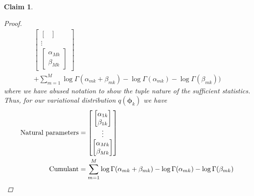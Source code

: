 \documentclass[11pt]{article}
\newtheorem{claim}{Claim}
\begin{document}
\begin{claim}
\begin{proof}
\begin{align*}
\begin{bmatrix}
\begin{bmatrix}
				\end{bmatrix} \\
				\vdots \\
				\begin{bmatrix}
				\alpha_{Mk} \\ \beta_{Mk}
				\end{bmatrix}
			\end{bmatrix} \\
			+ \sum\limits_{m=1}^M \log \Gamma(\alpha_{mk} + \beta_{mk}) - \log \Gamma(\alpha_{mk}) - \log\Gamma(\beta_{mk}) \bigg)
\end{align*}
where we have abused notation to show the tuple nature of the sufficient statistics. Thus, for our variational distribution $q(\bm{\phi}_k)$ we have
\begin{align}
\text{Natural parameters} &=  			\begin{bmatrix}
				\begin{bmatrix}
				\alpha_{1k} \\ \beta_{1k} 
				\end{bmatrix} \\
				\vdots \\
				\begin{bmatrix}
				\alpha_{Mk} \\ \beta_{Mk}
				\end{bmatrix}
			\end{bmatrix} \\
\text{Cumulant} &= \sum\limits_{m=1}^M \log \Gamma(\alpha_{mk} + \beta_{mk}) - \log \Gamma(\alpha_{mk}) - \log\Gamma(\beta_{mk}) \qedhere
\end{align}
\end{proof}
\end{claim}
\end{document}
